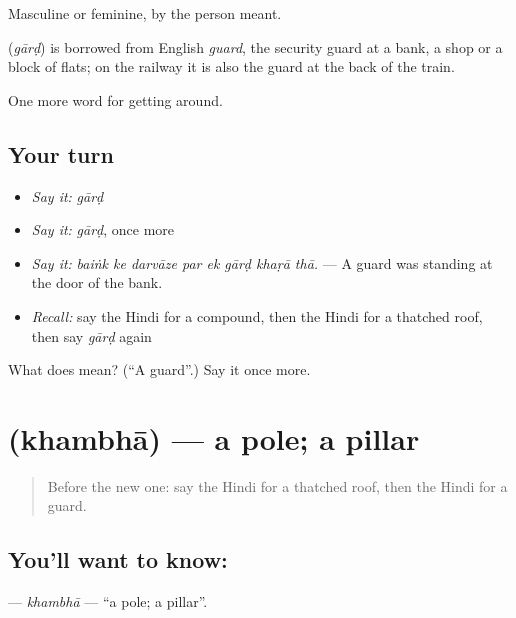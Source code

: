 Masculine or feminine, by the person meant.

\begin{cousinweb}
\textbf{} (\emph{gārḍ}) is borrowed from English \emph{guard}, the security guard at a bank, a shop or a block of flats; on the railway it is also the guard at the back of the train.
\end{cousinweb}

\begin{grammarlens}[title={What you've built}]
One more word for getting around.
\end{grammarlens}

\subsection*{Your turn}
\begin{itemize}
\raggedright
  \item \emph{Say it:} \emph{gārḍ}
  \item \emph{Say it:} \emph{gārḍ}, once more
  \item \emph{Say it:} \emph{baiṅk ke darvāze par ek gārḍ khaṛā thā.} — A guard was standing at the door of the bank.
  \item \emph{Recall:} say the Hindi for a compound, then the Hindi for a thatched roof, then say \emph{gārḍ} again
\end{itemize}

\begin{tcolorbox}[breakable,colback=teal!4,colframe=teal!35!black,title={Before you move on}]
What does  mean? (\textquotedblleft{}A guard\textquotedblright{}.) Say it once more.
\end{tcolorbox}
\section[\texorpdfstring{\hi{खंभा} (khambhā)}{खंभा (khambhā)}]{ (khambhā) — a pole; a pillar}

\label{lesson:HI-C423-khambha}



\begin{quote}
Before the new one: say the Hindi for a thatched roof, then the Hindi for a guard.
\end{quote}

\subsection*{You'll want to know: }
\textbf{} — \emph{khambhā} — \textquotedblleft{}a pole; a pillar\textquotedblright{}.

